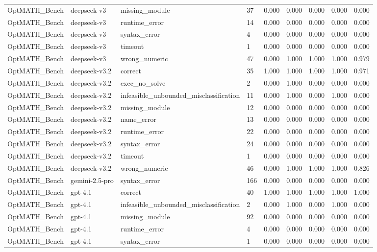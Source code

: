\begin{table}[t]
\begin{tabular}{lllllllll}
OptMATH\_Bench & deepseek-v3 & missing\_module & 37 & 0.000 & 0.000 & 0.000 & 0.000 & 0.000 \\
OptMATH\_Bench & deepseek-v3 & runtime\_error & 14 & 0.000 & 0.000 & 0.000 & 0.000 & 0.000 \\
OptMATH\_Bench & deepseek-v3 & syntax\_error & 4 & 0.000 & 0.000 & 0.000 & 0.000 & 0.000 \\
OptMATH\_Bench & deepseek-v3 & timeout & 1 & 0.000 & 0.000 & 0.000 & 0.000 & 0.000 \\
OptMATH\_Bench & deepseek-v3 & wrong\_numeric & 47 & 0.000 & 1.000 & 1.000 & 1.000 & 0.979 \\
OptMATH\_Bench & deepseek-v3.2 & correct & 35 & 1.000 & 1.000 & 1.000 & 1.000 & 0.971 \\
OptMATH\_Bench & deepseek-v3.2 & exec\_no\_solve & 2 & 0.000 & 1.000 & 0.000 & 0.000 & 0.000 \\
OptMATH\_Bench & deepseek-v3.2 & infeasible\_unbounded\_misclassification & 11 & 0.000 & 1.000 & 0.000 & 1.000 & 0.000 \\
OptMATH\_Bench & deepseek-v3.2 & missing\_module & 12 & 0.000 & 0.000 & 0.000 & 0.000 & 0.000 \\
OptMATH\_Bench & deepseek-v3.2 & name\_error & 13 & 0.000 & 0.000 & 0.000 & 0.000 & 0.000 \\
OptMATH\_Bench & deepseek-v3.2 & runtime\_error & 22 & 0.000 & 0.000 & 0.000 & 0.000 & 0.000 \\
OptMATH\_Bench & deepseek-v3.2 & syntax\_error & 24 & 0.000 & 0.000 & 0.000 & 0.000 & 0.000 \\
OptMATH\_Bench & deepseek-v3.2 & timeout & 1 & 0.000 & 0.000 & 0.000 & 0.000 & 0.000 \\
OptMATH\_Bench & deepseek-v3.2 & wrong\_numeric & 46 & 0.000 & 1.000 & 1.000 & 1.000 & 0.826 \\
OptMATH\_Bench & gemini-2.5-pro & syntax\_error & 166 & 0.000 & 0.000 & 0.000 & 0.000 & 0.000 \\
OptMATH\_Bench & gpt-4.1 & correct & 40 & 1.000 & 1.000 & 1.000 & 1.000 & 1.000 \\
OptMATH\_Bench & gpt-4.1 & infeasible\_unbounded\_misclassification & 2 & 0.000 & 1.000 & 0.000 & 1.000 & 0.000 \\
OptMATH\_Bench & gpt-4.1 & missing\_module & 92 & 0.000 & 0.000 & 0.000 & 0.000 & 0.000 \\
OptMATH\_Bench & gpt-4.1 & runtime\_error & 4 & 0.000 & 0.000 & 0.000 & 0.000 & 0.000 \\
OptMATH\_Bench & gpt-4.1 & syntax\_error & 1 & 0.000 & 0.000 & 0.000 & 0.000 & 0.000 \\

\end{tabular}
\end{table}
